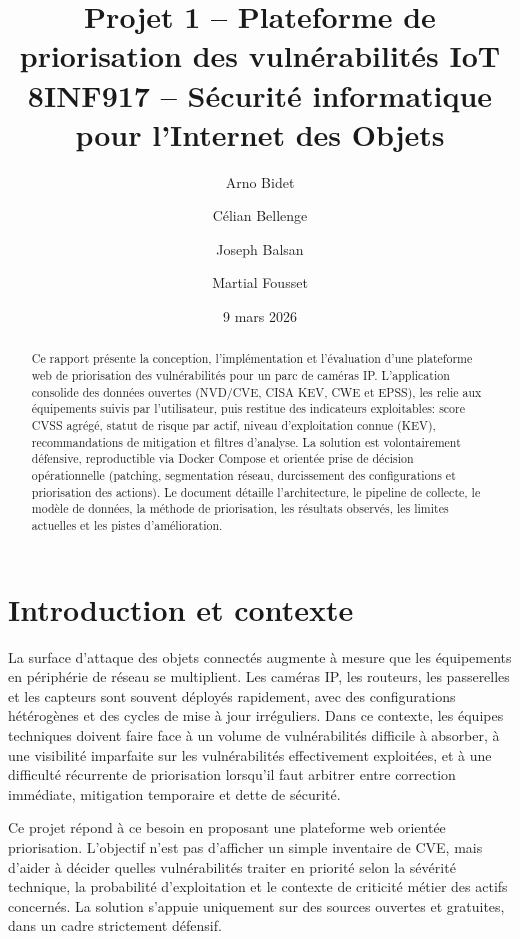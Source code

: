 \documentclass[12pt]{article}
\title{Projet 1 -- Plateforme de priorisation des vulnérabilités IoT\\
\large 8INF917 -- Sécurité informatique pour l'Internet des Objets}
\author{Arno Bidet \and Célian Bellenge \and Joseph Balsan \and Martial Fousset}
\date{9 mars 2026}
\begin{document}
\maketitle

\begin{abstract}
Ce rapport présente la conception, l'implémentation et l'évaluation d'une plateforme web de priorisation des vulnérabilités pour un parc de caméras IP. L'application consolide des données ouvertes (NVD/CVE, CISA KEV, CWE et EPSS), les relie aux équipements suivis par l'utilisateur, puis restitue des indicateurs exploitables: score CVSS agrégé, statut de risque par actif, niveau d'exploitation connue (KEV), recommandations de mitigation et filtres d'analyse. La solution est volontairement défensive, reproductible via Docker Compose et orientée prise de décision opérationnelle (patching, segmentation réseau, durcissement des configurations et priorisation des actions). Le document détaille l'architecture, le pipeline de collecte, le modèle de données, la méthode de priorisation, les résultats observés, les limites actuelles et les pistes d'amélioration.
\end{abstract}

\tableofcontents
\newpage

\section{Introduction et contexte}
La surface d'attaque des objets connectés augmente à mesure que les équipements en périphérie de réseau se multiplient. Les caméras IP, les routeurs, les passerelles et les capteurs sont souvent déployés rapidement, avec des configurations hétérogènes et des cycles de mise à jour irréguliers. Dans ce contexte, les équipes techniques doivent faire face à un volume de vulnérabilités difficile à absorber, à une visibilité imparfaite sur les vulnérabilités effectivement exploitées, et à une difficulté récurrente de priorisation lorsqu'il faut arbitrer entre correction immédiate, mitigation temporaire et dette de sécurité.

Ce projet répond à ce besoin en proposant une plateforme web orientée priorisation. L'objectif n'est pas d'afficher un simple inventaire de CVE, mais d'aider à décider quelles vulnérabilités traiter en priorité selon la sévérité technique, la probabilité d'exploitation et le contexte de criticité métier des actifs concernés. La solution s'appuie uniquement sur des sources ouvertes et gratuites, dans un cadre strictement défensif.
\end{document}
